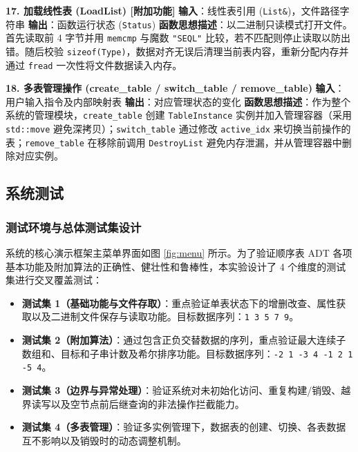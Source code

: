 \documentclass[supercite]{Experimental_Report}
\theoremstyle{definition}
\begin{document}
\vspace{0.5em}
\noindent\textbf{17. 加载线性表 (LoadList) [附加功能]}
\newline\textbf{输入}：线性表引用 (\texttt{List\&})，文件路径字符串
\newline\textbf{输出}：函数运行状态 (\texttt{Status})
\newline\textbf{函数思想描述}：以二进制只读模式打开文件。首先读取前 4 字节并用 \texttt{memcmp} 与魔数 \texttt{"SEQL"} 比较，若不匹配则停止读取以防出错。随后校验 \texttt{sizeof(Type)}，数据对齐无误后清理当前表内容，重新分配内存并通过 \texttt{fread} 一次性将文件数据读入内存。

\vspace{0.5em}
\noindent\textbf{18. 多表管理操作 (create\_table / switch\_table / remove\_table)}
\newline\textbf{输入}：用户输入指令及内部映射表
\newline\textbf{输出}：对应管理状态的变化
\newline\textbf{函数思想描述}：作为整个系统的管理模块，\texttt{create\_table} 创建 \texttt{TableInstance} 实例并加入管理容器（采用 \texttt{std::move} 避免深拷贝）；\texttt{switch\_table} 通过修改 \texttt{active\_idx} 来切换当前操作的表；\texttt{remove\_table} 在移除前调用 \texttt{DestroyList} 避免内存泄漏，并从管理容器中删除对应实例。

\subsection{系统测试}

\subsubsection{测试环境与总体测试集设计}
系统的核心演示框架主菜单界面如图 \ref{fig:menu} 所示。为了验证顺序表 ADT 各项基本功能及附加算法的正确性、健壮性和鲁棒性，本实验设计了 4 个维度的测试集进行交叉覆盖测试：

\begin{itemize}
	\item \textbf{测试集 1（基础功能与文件存取）}：重点验证单表状态下的增删改查、属性获取以及二进制文件保存与读取功能。目标数据序列：\texttt{1 3 5 7 9}。
	\item \textbf{测试集 2（附加算法）}：通过包含正负交替数据的序列，重点验证最大连续子数组和、目标和子串计数及希尔排序功能。目标数据序列：\texttt{-2 1 -3 4 -1 2 1 -5 4}。
	\item \textbf{测试集 3（边界与异常处理）}：验证系统对未初始化访问、重复构建/销毁、越界读写以及空节点前后继查询的非法操作拦截能力。
	\item \textbf{测试集 4（多表管理）}：验证多实例管理下，数据表的创建、切换、各表数据互不影响以及销毁时的动态调整机制。
\end{itemize}
\end{document}
